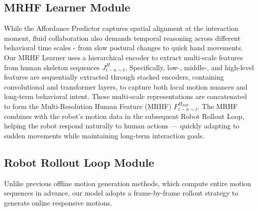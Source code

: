 



\subsection{MRHF Learner Module}
While the Affordance Predictor captures spatial alignment at the interaction moment, fluid collaboration also demands temporal reasoning across different behavioral time scales - from slow postural changes to quick hand movements. Our MRHF Learner uses a hierarchical encoder to extract multi-scale features from human skeleton sequences $J_{t-n\sim t}^{H}$.
Specifically, low-, middle-, and high-level features are sequentially extracted through stacked encoders, containing convolutional and transformer layers, to capture both local motion nuances and long-term behavioral intent. These multi-scale representations are concatenated to form the Multi-Resolution Human Feature (MRHF) $F^{H_{MR}}_{t-n\sim t}$.
The MRHF combines with the robot's motion data in the subsequent Robot Rollout Loop, helping the robot respond naturally to human actions — quickly adapting to sudden movements while maintaining long-term interaction goals. %

\subsection{Robot Rollout Loop Module}
Unlike previous offline motion generation methods, which compute entire motion sequences in advance, our model adopts a frame-by-frame rollout strategy to generate online responsive motions.


